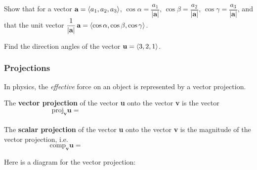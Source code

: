 \documentclass[notes]{subfiles}
\begin{document}
		\begin{ex}
			Show that for a vector $\textbf{a} = \left\langle a_1,a_2,a_3\right\rangle$, $\cos \alpha = \dfrac{a_1}{|\textbf{a}|}$, $\cos \beta = \dfrac{a_2}{|\textbf{a}|}$, $\cos\gamma = \dfrac{a_3}{|\textbf{a}|}$, and that the unit vector $\dfrac{1}{|\textbf{a}|}\,\textbf{a} = \left\langle \cos\alpha,\cos\beta,\cos\gamma\right\rangle$.
		\end{ex}
			
		\begin{ex}
			Find the direction angles of the vector $\textbf{u} = \left\langle 3,2,1\right\rangle$.
		\end{ex}
			
	\subsubsection*{Projections}
		In physics, the \emph{effective} force on an object is represented by a vector projection.
		
		\begin{defn}
			The \textbf{vector projection} of the vector \textbf{u} onto the vector \textbf{v} is the vector\\[15pt]
				\[\text{proj}_{\textbf{v}}\textbf{u} = \hspace{3in}\]
				\\[10pt]
			The \textbf{scalar projection} of the vector \textbf{u} onto the vector \textbf{v} is the magnitude of the vector projection, i.e.\\[15pt]
				\[\text{comp}_{\textbf{v}}\textbf{u} = \hspace{3in}\]
		\end{defn}
			\newpage
			
		Here is a diagram for the vector projection:\\
		\begin{flushleft}
		\end{flushleft}
		
\end{document}
